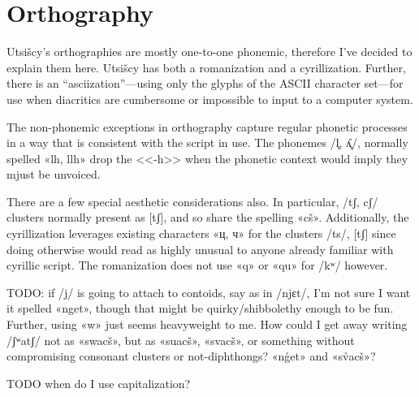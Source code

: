 \documentclass[12pt]{book} %
\begin{document}
\section{Orthography}

Utsišcy's orthographies are mostly one-to-one phonemic, therefore I've decided to explain them here.
Utsišcy has both a romanization and a cyrillization.
Further, there is an ``asciization''---using only the glyphs of the ASCII character set---for use when diacritics are cumbersome or impossible to input to a computer system.

The non-phonemic exceptions in orthography capture regular phonetic processes in a way that is consistent with the script in use.
The phonemes /l̥, ʎ̥/, normally spelled «lh, llh» drop the <<-h>> when the phonetic context would imply they mjust be unvoiced.

There are a few special aesthetic considerations also.
In particular, /tʃ, cʃ/ clusters normally present as [tʃ], and so share the spelling «cš».
Additionally, the cyrillization leverages existing characters «ц, ч» for the clusters /ts/, [tʃ] since doing otherwise would read as highly unusual to anyone already familiar with cyrillic script.
The romanization does not use «q» or «qu» for /kʷ/ however.


TODO: if /j/ is going to attach to contoids, say as in /njɛt/, I'm not sure I want it spelled «nget», though that might be quirky/shibbolethy enough to be fun.
Further, using «w» just seems heavyweight to me. How could I get away writing /ʃʷatʃ/ not as «swacš», but as «suacš», «svacš», or something without compromising consonant clusters or not-diphthongs?
«ng̊et» and «sv̊acš»?

TODO when do I use capitalization?
\end{document}
